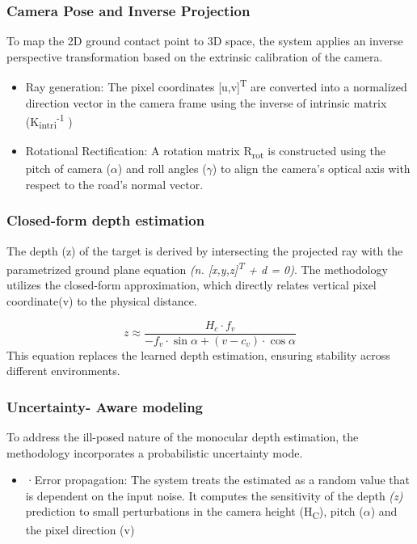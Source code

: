 \documentclass[12pt,a4paper]{report}
\begin{document}
{{\subsubsection{\textbf{Camera Pose and Inverse Projection}
}}
To map the 2D ground contact point to 3D space, the system applies an inverse perspective transformation based on the extrinsic calibration of the camera.

 \begin{itemize}
     \item Ray generation: The pixel coordinates [u,v]\textsuperscript{T }are converted into a normalized direction vector in the camera frame using the inverse of intrinsic matrix (K\textsubscript{intri}\textsuperscript{-1} )
 \end{itemize}

 \begin{itemize}
     \item Rotational Rectification: A rotation matrix R\textsubscript{rot }is constructed using the pitch of camera ($\alpha$) and roll angles ($\gamma$) to align the camera’s optical axis with respect to the road’s normal vector.
 \end{itemize}

{\subsubsection{\textbf{Closed-form depth estimation}
}}
The depth (z) of the target is derived by intersecting the projected ray with the parametrized ground plane equation\textit{ (n. [x,y,z]\textsuperscript{T} + d = 0)}. The methodology utilizes the closed-form approximation, which directly relates vertical pixel coordinate(v) to the physical distance.

\begin{equation}
z \approx \frac{H_c \cdot f_v}{-f_v \cdot \sin \alpha + (v - c_v) \cdot \cos \alpha}
\label{eq:depth_estimation}
\end{equation}
This equation replaces the learned depth estimation, ensuring stability across different environments. 

{\subsubsection{\textbf{Uncertainty- Aware modeling}
}}
To address the ill-posed nature of the monocular depth estimation, the methodology incorporates a probabilistic uncertainty mode.

\begin{itemize}
    \item ·Error propagation: The system treats the estimated as a random value that is dependent on the input noise. It computes the sensitivity of the depth \textit{(z) }prediction to small perturbations in the camera height (H\textsubscript{C}), pitch ($\alpha$) and the pixel direction (v)
\end{itemize}

}
\end{document}
